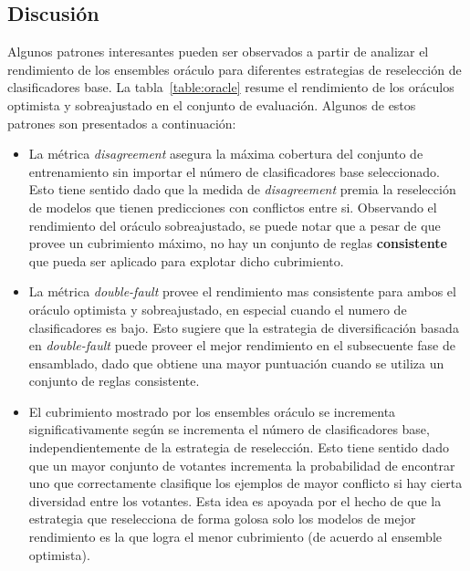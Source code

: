\subsection{Discusión}\label{section:discussion-first-phase}

Algunos patrones interesantes pueden ser observados a partir de analizar el rendimiento de los ensembles oráculo para diferentes estrategias de reselección de clasificadores base.
La tabla~\ref{table:oracle} resume el rendimiento de los oráculos optimista y sobreajustado en el conjunto de evaluación.
Algunos de estos patrones son presentados a continuación:

\begin{itemize}
    \item 
    La métrica \emph{disagreement} asegura la máxima cobertura del conjunto de entrenamiento sin importar el número de clasificadores base seleccionado.
    Esto tiene sentido dado que la medida de \emph{disagreement} premia la reselección de modelos que tienen predicciones con conflictos entre si.
    Observando el rendimiento del oráculo sobreajustado, se puede notar que a pesar de que provee un cubrimiento máximo, no hay un conjunto de reglas \textbf{consistente} que pueda ser aplicado para explotar dicho cubrimiento.
    
    \item
    La métrica \emph{double-fault} provee el rendimiento mas consistente para ambos el oráculo optimista y sobreajustado, en especial cuando el numero de clasificadores es bajo.
    Esto sugiere que la estrategia de diversificación basada en \emph{double-fault} puede proveer el mejor rendimiento en el subsecuente fase de ensamblado, dado que obtiene una mayor puntuación cuando se utiliza un conjunto de reglas consistente. 
    
    \item
    El cubrimiento mostrado por los ensembles oráculo se incrementa significativamente según se incrementa el número de clasificadores base, independientemente de la estrategia de reselección.
    Esto tiene sentido dado que un mayor conjunto de votantes incrementa la probabilidad de encontrar uno que correctamente clasifique los ejemplos de mayor conflicto si hay cierta diversidad entre los votantes.
    Esta idea es apoyada por el hecho de que la estrategia que reselecciona de forma golosa solo los modelos de mejor rendimiento es la que logra el menor cubrimiento (de acuerdo al ensemble optimista).
\end{itemize}

